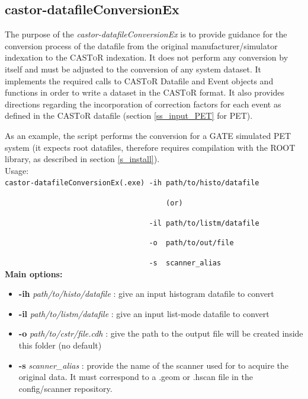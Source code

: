 \documentclass[a4paper, 11pt]{article}
\newcommand{\castor}{\textsc{CASToR}\xspace}
\begin{document}
\subsection{castor-datafileConversionEx}
\label{ss_utilities_conversion}

The purpose of the \textit{castor-datafileConversionEx} is to provide guidance for the conversion process of the datafile from the original manufacturer/simulator indexation to the \castor indexation. It does not perform any conversion by itself and must be adjusted to the conversion of any system dataset. It implements the required calls to \castor Datafile and Event objects and functions in order to write a dataset in the \castor format. It also provides directions regarding the incorporation of correction factors for each event as defined in the \castor datafile (section \ref{ss_input_PET}
for PET). 

As an example, the script performs the conversion for a GATE simulated PET system (it expects root datafiles, therefore requires compilation
with the ROOT library, as described in section \ref{s_install}).\\

Usage:\\
  
\verb|castor-datafileConversionEx(.exe) -ih path/to/histo/datafile|

\verb|                                      (or)|

\verb|                                  -il path/to/listm/datafile|

\verb|                                  -o  path/to/out/file|

\verb|                                  -s  scanner_alias|\\


\textbf{Main options:}
\begin{itemize}
  \item \textbf{-ih} \textit{path/to/histo/datafile} : give an input histogram datafile to convert
  \item \textbf{-il} \textit{path/to/listm/datafile} : give an input list-mode datafile to convert
  \item \textbf{-o}  \textit{path/to/cstr/file.cdh}  : give the path to the output file will be created inside this folder (no default)
  \item \textbf{-s}  \textit{scanner\_alias}         : provide the name of the scanner used for to acquire the original data. It must
        correspond to a .geom or .hscan file in the config/scanner repository.
\end{itemize}
\end{document}
